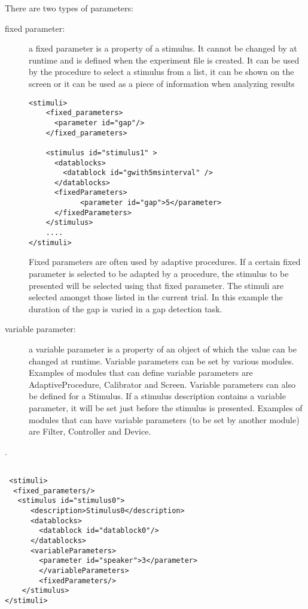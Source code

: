 There are two types of parameters:
\begin{description}

\item [fixed parameter:] a fixed parameter is a property of a
stimulus. It cannot be changed by \apex at runtime and is defined
when the experiment file is created. It can be used by the
procedure to select a stimulus from a list, it can be shown on the
screen or it can be used as a piece of information when analyzing
results

\begin{lstlisting}
<stimuli>
    <fixed_parameters>
      <parameter id="gap"/>
    </fixed_parameters>

    <stimulus id="stimulus1" >
      <datablocks>
        <datablock id="gwith5msinterval" />
      </datablocks>
      <fixedParameters>
            <parameter id="gap">5</parameter>
      </fixedParameters>
    </stimulus>
    ....
</stimuli>
\end{lstlisting}

Fixed parameters are often used by adaptive procedures. If a
certain fixed parameter is selected to be adapted by a procedure,
the stimulus to be presented will be selected using that fixed
parameter. The stimuli are selected amongst those listed in the
current trial. In this example the duration of the gap is varied
in a gap detection task.

 \item [variable parameter:] a variable parameter is a
property of an object of which the value can be changed at
runtime. Variable parameters can be set by various \apex modules.
Examples of modules that can define variable parameters are
AdaptiveProcedure, Calibrator and Screen. Variable parameters can
also be defined for a Stimulus. If a stimulus description contains a
variable parameter, it will be set just before the stimulus is
presented. Examples of modules that can have variable parameters
(to be set by another module) are Filter, Controller and Device.
\end{description}.

\begin{lstlisting}

 <stimuli>
  <fixed_parameters/>
   <stimulus id="stimulus0">
      <description>Stimulus0</description>
      <datablocks>
        <datablock id="datablock0"/>
      </datablocks>
      <variableParameters>
        <parameter id="speaker">3</parameter>
        </variableParameters>
        <fixedParameters/>
    </stimulus>
</stimuli>

\end{lstlisting}


